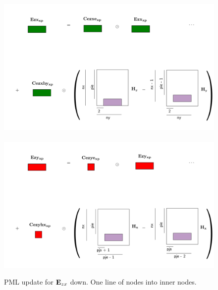 \documentclass[a4paper,12pt]{article}
\begin{document}
\begin{figure}
\centering
\includegraphics[width=1\textwidth]{../pics/tikz/svg/pml-color/Ezx-xp.pdf}
~
\includegraphics[width=1\textwidth]{../pics/tikz/svg/pml-color/Ezy-xp.pdf}
\caption{PML update for ${\bf E}_{zx}$ down. One line of nodes into inner nodes.}
\end{figure}
%
\end{document}
